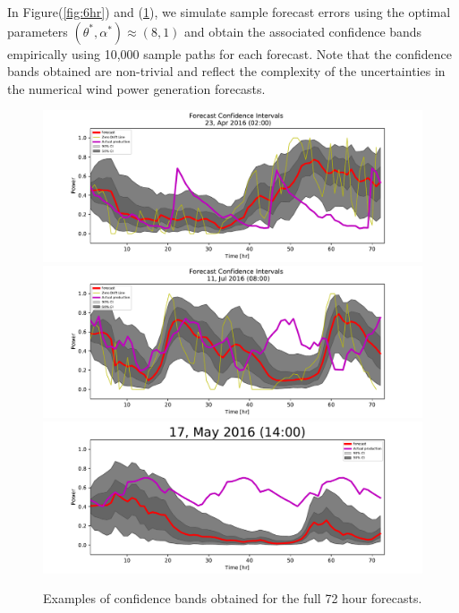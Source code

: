 \documentclass[10pt,twocolumn,letterpaper]{article}
\begin{document}
 
 
In Figure(\ref{fig:6hr}) and (\ref{fig:72hr}), we simulate sample forecast errors using the optimal parameters  $(\theta^*, \alpha^*)\approx (8,1)$ and obtain the associated confidence bands empirically using 10,000 sample paths for each forecast. Note that the confidence bands obtained are non-trivial and reflect the complexity of the uncertainties in the numerical wind power generation forecasts.

\begin{figure}[t]
\begin{center}
   \includegraphics[width=0.9\linewidth]{72hr_forecast_CI_343.pdf}
   \includegraphics[width=0.9\linewidth]{72hr_forecast_CI_573.pdf}
   \includegraphics[width=0.9\linewidth]{72hr_forecast_CI_396.pdf}

\end{center}
   \caption{ Examples of confidence bands obtained for the full 72 hour forecasts. }
\label{fig:72hr}
\end{figure}
\end{document}

